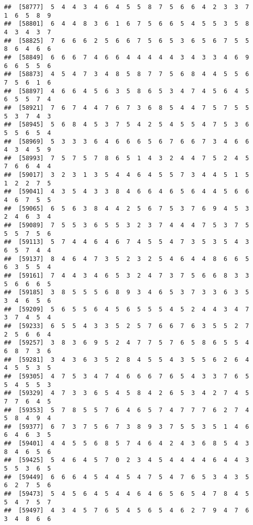 \documentclass[
]{book}
\begin{document}
\begin{verbatim}
##  [58777]  5  4  4  3  4  6  4  5  5  8  7  5  6  6  4  2  3  3  7  1  6  5  8  9
##  [58801]  6  4  4  8  3  6  1  6  7  5  6  6  5  4  5  5  3  5  8  4  3  4  3  7
##  [58825]  7  6  6  6  2  5  6  6  7  5  6  5  3  6  5  6  7  5  5  8  6  4  6  6
##  [58849]  6  6  6  7  4  6  6  4  4  4  4  4  3  4  3  3  4  6  9  6  6  5  5  6
##  [58873]  4  5  4  7  3  4  8  5  8  7  7  5  6  8  4  4  5  5  6  7  5  6  1  6
##  [58897]  4  6  6  4  5  6  3  5  8  6  5  3  4  7  4  5  6  4  5  6  5  5  7  4
##  [58921]  7  6  7  4  4  7  6  7  3  6  8  5  4  4  7  5  7  5  5  5  3  7  4  3
##  [58945]  5  6  8  4  5  3  7  5  4  2  5  4  5  5  4  7  5  3  6  5  5  6  5  4
##  [58969]  5  3  3  3  6  4  6  6  6  5  6  7  6  6  7  3  4  6  6  4  3  4  5  9
##  [58993]  7  5  7  5  7  8  6  5  1  4  3  2  4  4  7  5  2  4  5  7  6  6  4  4
##  [59017]  3  2  3  1  3  5  4  4  6  4  5  5  7  3  4  4  5  1  5  1  2  2  7  5
##  [59041]  4  3  5  4  3  3  8  4  6  6  4  6  5  6  4  4  5  6  6  4  6  7  5  5
##  [59065]  6  5  6  3  8  4  4  2  5  6  7  5  3  7  6  9  4  5  3  2  4  6  3  4
##  [59089]  7  5  5  3  6  5  5  3  2  3  7  4  4  4  7  5  3  7  5  5  5  7  5  6
##  [59113]  5  7  4  4  6  4  6  7  4  5  5  4  7  3  5  3  5  4  3  6  5  7  4  4
##  [59137]  8  4  6  4  7  3  5  2  3  2  5  4  6  4  4  8  6  6  5  6  3  5  5  4
##  [59161]  7  4  4  3  4  6  5  3  2  4  7  3  7  5  6  6  8  3  3  5  6  6  6  5
##  [59185]  3  8  5  5  5  6  8  9  3  4  6  5  3  7  3  3  6  3  5  3  4  6  5  6
##  [59209]  5  6  5  5  6  4  5  6  5  5  5  4  5  2  4  4  3  4  7  3  7  4  5  4
##  [59233]  6  5  5  4  3  3  5  2  5  7  6  6  7  6  3  5  5  2  7  2  5  6  6  4
##  [59257]  3  8  3  6  9  5  2  4  7  7  5  7  6  5  8  6  5  5  4  6  8  7  3  6
##  [59281]  3  4  3  6  3  5  2  8  4  5  5  4  3  5  5  6  2  6  4  4  5  5  3  5
##  [59305]  4  7  5  3  4  7  4  6  6  6  7  6  5  4  3  3  7  6  5  5  4  5  5  3
##  [59329]  4  7  3  3  6  5  4  5  8  4  2  6  5  3  4  2  7  4  5  7  7  6  4  5
##  [59353]  5  7  8  5  5  7  6  4  6  5  7  4  7  7  7  6  2  7  4  5  8  4  9  4
##  [59377]  6  7  3  7  5  6  7  3  8  9  3  7  5  5  3  5  1  4  6  6  4  6  3  5
##  [59401]  4  4  5  5  6  8  5  7  4  6  4  2  4  3  6  8  5  4  3  8  4  6  5  6
##  [59425]  5  4  6  4  5  7  0  2  3  4  5  4  4  4  4  6  4  4  3  5  5  3  6  5
##  [59449]  6  6  6  4  5  4  4  5  4  7  5  4  7  6  5  3  4  3  5  6  2  7  5  6
##  [59473]  5  4  5  6  4  5  4  4  6  4  6  5  6  5  4  7  8  4  5  5  4  7  5  7
##  [59497]  4  3  4  5  7  6  5  4  5  6  5  4  6  2  7  9  4  7  6  3  4  8  6  6

\end{verbatim}
\end{document}
